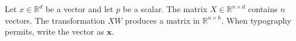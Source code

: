 Let $x \in \mathbb{R}^{d}$ be a vector and let $p$ be a scalar.
The matrix $X \in \mathbb{R}^{n \times d}$ contains $n$ vectors.
The transformation $XW$ produces a matrix in $\mathbb{R}^{n \times h}$.
When typography permits, write the vector as $\mathbf{x}$.
